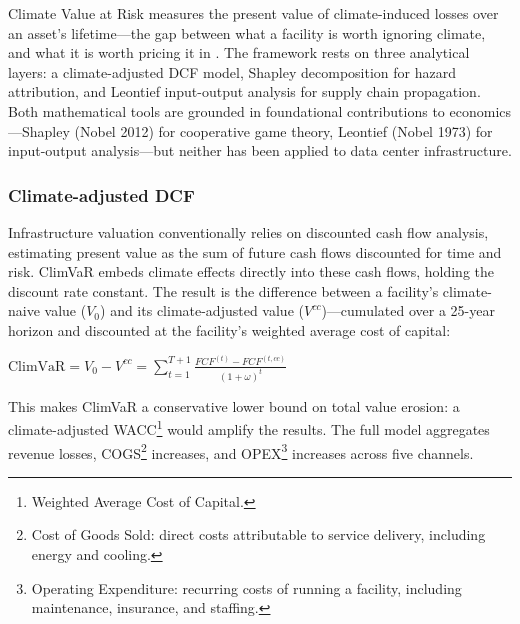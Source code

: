 \begin{twocolbody}

\noindent Climate Value at Risk measures the present value of climate-induced losses over an asset's lifetime---the gap between what a facility is worth ignoring climate, and what it is worth pricing it in \citep{epelbaum2025}. The framework rests on three analytical layers: a climate-adjusted DCF model, Shapley decomposition for hazard attribution, and Leontief input-output analysis for supply chain propagation. Both mathematical tools are grounded in foundational contributions to economics---Shapley (Nobel 2012) for cooperative game theory, Leontief (Nobel 1973) for input-output analysis---but neither has been applied to data center infrastructure.

\subsubsection*{Climate-adjusted DCF}

Infrastructure valuation conventionally relies on discounted cash flow analysis, estimating present value as the sum of future cash flows discounted for time and risk. ClimVaR embeds climate effects directly into these cash flows, holding the discount rate constant. The result is the difference between a facility's climate-naive value ($V_0$) and its climate-adjusted value ($V^{cc}$)---cumulated over a 25-year horizon and discounted at the facility's weighted average cost of capital:

\vspace{1mm}
\begin{center}
$\text{ClimVaR} = V_0 - V^{cc} = \displaystyle\sum_{t=1}^{T+1} \frac{FCF^{(t)} - FCF^{(t,cc)}}{(1+\omega)^t}$
\end{center}
\vspace{1mm}

\noindent This makes ClimVaR a conservative lower bound on total value erosion: a climate-adjusted WACC\footnote{Weighted Average Cost of Capital.} would amplify the results. The full model aggregates revenue losses, COGS\footnote{Cost of Goods Sold: direct costs attributable to service delivery, including energy and cooling.} increases, and OPEX\footnote{Operating Expenditure: recurring costs of running a facility, including maintenance, insurance, and staffing.} increases across five channels.

\end{twocolbody}

